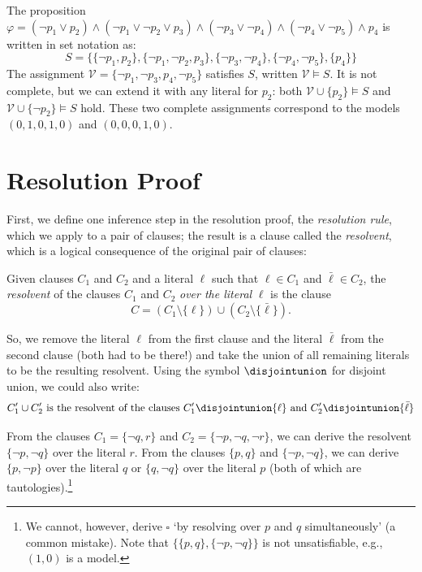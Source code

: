 \begin{example}\label{example:set-representation}
    The proposition $\varphi = (\neg p_1 \lor p_2) \land (\neg p_1 \lor \neg p_2 \lor p_3) \land (\neg p_3 \lor \neg p_4) \land (\neg p_4 \lor \neg p_5) \land p_4$ is written in set notation as:
    $$
    S = \{\{\neg p_1, p_2\}, \{\neg p_1, \neg p_2, p_3\}, \{\neg p_3, \neg p_4\}, \{\neg p_4, \neg p_5\}, \{p_4\}\}
    $$
    The assignment $\mathcal{V} = \{\neg p_1, \neg p_3, p_4, \neg p_5\}$ satisfies $S$, written $\mathcal{V} \models S$. It is not complete, but we can extend it with any literal for $p_2$: both $\mathcal{V} \cup \{p_2\} \models S$ and $\mathcal{V} \cup \{\neg p_2\} \models S$ hold. These two complete assignments correspond to the models $(0,1,0,1,0)$ and $(0,0,0,1,0)$.
\end{example}

\section{Resolution Proof}

First, we define one inference step in the resolution proof, the \emph{resolution rule}, which we apply to a pair of clauses; the result is a clause called the \emph{resolvent}, which is a logical consequence of the original pair of clauses:

\begin{definition}
    Given clauses $C_1$ and $C_2$ and a literal $\ell$ such that $\ell \in C_1$ and $\bar{\ell} \in C_2$, the \emph{resolvent} of the clauses $C_1$ and $C_2$ \emph{over the literal} $\ell$ is the clause
    $$
    C = (C_1 \setminus \{\ell\}) \cup (C_2 \setminus \{\bar{\ell}\}).
    $$
\end{definition}

So, we remove the literal $\ell$ from the first clause and the literal $\bar{\ell}$ from the second clause (both had to be there!) and take the union of all remaining literals to be the resulting resolvent. Using the symbol $\disjointunion$ for disjoint union, we could also write:
$$
C_1' \cup C_2' \text{ is the resolvent of the clauses } C_1' \disjointunion \{\ell\} \text{ and } C_2' \disjointunion \{\bar{\ell}\}
$$

\begin{example}
    From the clauses $C_1 = \{\neg q, r\}$ and $C_2 = \{\neg p, \neg q, \neg r\}$, we can derive the resolvent $\{\neg p, \neg q\}$ over the literal $r$. From the clauses $\{p, q\}$ and $\{\neg p, \neg q\}$, we can derive $\{p, \neg p\}$ over the literal $q$ or $\{q, \neg q\}$ over the literal $p$ (both of which are tautologies).\footnote{We cannot, however, derive $\square$ `by resolving over $p$ and $q$ simultaneously' (a common mistake). Note that $\{\{p, q\}, \{\neg p, \neg q\}\}$ is not unsatisfiable, e.g., $(1,0)$ is a model.}
\end{example}

